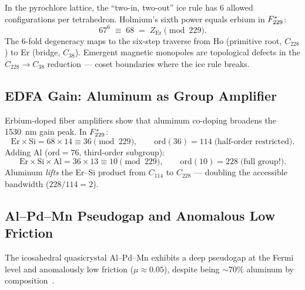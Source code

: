 In the pyrochlore lattice, the ``two-in, two-out'' ice rule has 6 allowed configurations per tetrahedron.  Holmium's sixth power equals erbium in $F_{229}^*$:
\[
67^6 \;\equiv\; 68 \;=\; Z_{\mathrm{Er}} \pmod{229}.
\]
The 6-fold degeneracy maps to the six-step traverse from Ho (primitive root, $C_{228}$) to Er (bridge, $C_{38}$).  Emergent magnetic monopoles are topological defects in the $C_{228} \to C_{38}$ reduction --- coset boundaries where the ice rule breaks.

\subsection{EDFA Gain: Aluminum as Group Amplifier}

Erbium-doped fiber amplifiers show that aluminum co-doping broadens the 1530~nm gain peak.  In $F_{229}^*$:
\[
\mathrm{Er} \times \mathrm{Si} = 68 \times 14 \equiv 36 \pmod{229}, \qquad \mathrm{ord}(36) = 114 \;\text{(half-order restricted)}.
\]
Adding Al ($\mathrm{ord} = 76$, third-order subgroup):
\[
\mathrm{Er} \times \mathrm{Si} \times \mathrm{Al} = 36 \times 13 \equiv 10 \pmod{229}, \qquad \mathrm{ord}(10) = 228 \;\text{(full group!)}.
\]
Aluminum \emph{lifts} the Er--Si product from $C_{114}$ to $C_{228}$ --- doubling the accessible bandwidth ($228/114 = 2$).


\subsection{Al--Pd--Mn Pseudogap and Anomalous Low Friction}
\label{sec:alpdmn-friction}

The icosahedral quasicrystal Al--Pd--Mn exhibits a deep pseudogap at the Fermi level and anomalously low friction ($\mu \approx 0.05$), despite being $\sim$70\% aluminum by composition~\cite{Dubois04}.

